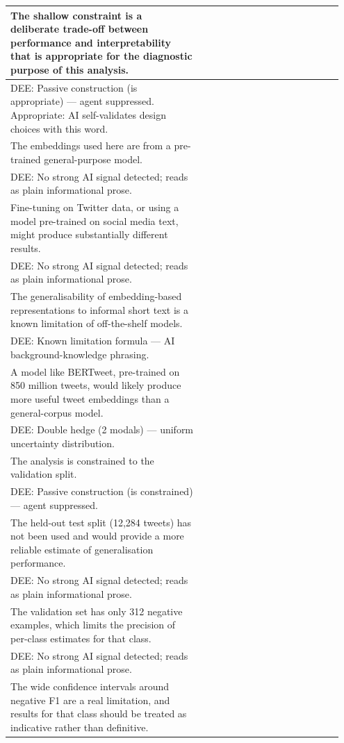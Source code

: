 \documentclass[11pt]{article}
\begin{document}
\begin{longtable}{|p{0.55\linewidth}|p{0.40\linewidth}|}
\hline
The shallow constraint is a deliberate trade-off between performance and interpretability that is appropriate for the diagnostic purpose of this analysis. & \\[2pt]
\hline
DEE: Passive construction (is appropriate) --- agent suppressed. Appropriate: AI self-validates design choices with this word. & \\
\hline
The embeddings used here are from a pre-trained general-purpose model. & \\[2pt]
\hline
DEE: No strong AI signal detected; reads as plain informational prose. & \\
\hline
Fine-tuning on Twitter data, or using a model pre-trained on social media text, might produce substantially different results. & \\[2pt]
\hline
DEE: No strong AI signal detected; reads as plain informational prose. & \\
\hline
The generalisability of embedding-based representations to informal short text is a known limitation of off-the-shelf models. & \\[2pt]
\hline
DEE: Known limitation formula --- AI background-knowledge phrasing. & \\
\hline
A model like BERTweet, pre-trained on 850 million tweets, would likely produce more useful tweet embeddings than a general-corpus model. & \\[2pt]
\hline
DEE: Double hedge (2 modals) --- uniform uncertainty distribution. & \\
\hline
The analysis is constrained to the validation split. & \\[2pt]
\hline
DEE: Passive construction (is constrained) --- agent suppressed. & \\
\hline
The held-out test split (12,284 tweets) has not been used and would provide a more reliable estimate of generalisation performance. & \\[2pt]
\hline
DEE: No strong AI signal detected; reads as plain informational prose. & \\
\hline
The validation set has only 312 negative examples, which limits the precision of per-class estimates for that class. & \\[2pt]
\hline
DEE: No strong AI signal detected; reads as plain informational prose. & \\
\hline
The wide confidence intervals around negative F1 are a real limitation, and results for that class should be treated as indicative rather than definitive. & \\[2pt]

\end{longtable}
\end{document}
